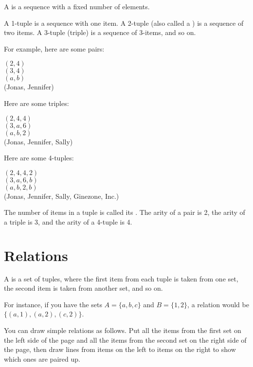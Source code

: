 \documentclass[../../../main.tex]{subfiles}
\begin{document}
\noindent
A  is a sequence with a fixed number of elements. 

A 1-tuple is a sequence with one item. A 2-tuple (also called a ) is a sequence of two items. A 3-tuple (triple) is a sequence of 3-items, and so on. 

For example, here are some pairs:

\begin{center}
$(2, 4)$ \\
$(3, 4)$ \\ 
$(a, b)$ \\
(Jonas, Jennifer)
\end{center}

\noindent
Here are some triples:

\begin{center}
$(2, 4, 4)$ \\
$(3, a, 6)$ \\ 
$(a, b, 2)$ \\
(Jonas, Jennifer, Sally)
\end{center}

\noindent
Here are some 4-tuples:

\begin{center}
$(2, 4, 4, 2)$ \\
$(3, a, 6, b)$ \\ 
$(a, b, 2, b)$ \\
(Jonas, Jennifer, Sally, Ginezone, Inc.)
\end{center}

\noindent
The number of items in a tuple is called its . The arity of a pair is 2, the arity of a triple is 3, and the arity of a 4-tuple is 4.


\section{Relations}

A  is a set of tuples, where the first item from each tuple is taken from one set, the second item is taken from another set, and so on.

For instance, if you have the sets $A = \{ a, b, c \}$ and $B = \{ 1, 2 \}$, a relation would be $\{ (a, 1), (a, 2), (c, 2) \}$.

You can draw simple relations as follows. Put all the items from the first set on the left side of the page and all the items from the second set on the right side of the page, then draw lines from items on the left to items on the right to show which ones are paired up. 
\end{document}
